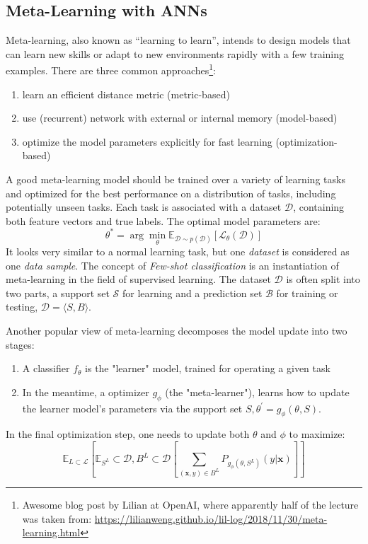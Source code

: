 \documentclass[main]{subfiles}
\begin{document}
\subsection{Meta-Learning with ANNs}
Meta-learning, also known as “learning to learn”, intends to design models that can learn new skills or adapt to new environments rapidly with a few training examples. There are three common approaches\footnote{Awesome blog post by Lilian at OpenAI, where apparently half of the lecture was taken from: \url{https://lilianweng.github.io/lil-log/2018/11/30/meta-learning.html}}: 
\begin{enumerate}
    \item learn an efficient distance metric (metric-based)
    \item use (recurrent) network with external or internal memory (model-based)
    \item optimize the model parameters explicitly for fast learning (optimization-based)
\end{enumerate}

A good meta-learning model should be trained over a variety of learning tasks and optimized for the best performance on a distribution of tasks, including potentially unseen tasks. Each task is associated with a dataset $\mathcal{D}$, containing both feature vectors and true labels. The optimal model parameters are:
%
\begin{equation}
\theta^{*}=\arg \min _{\theta} \mathbb{E}_{\mathcal{D} \sim p(\mathcal{D})}\left[\mathcal{L}_{\theta}(\mathcal{D})\right]
\end{equation}
%
It looks very similar to a normal learning task, but one \textit{dataset} is considered as one \textit{data sample}. The concept of \textit{Few-shot classification} is an instantiation of meta-learning in the field of supervised learning. The dataset $\mathcal{D}$ is often split into two parts, a support set $\mathcal{S}$ for learning and a prediction set $\mathcal{B}$ for training or testing,  $\mathcal{D}=\langle S, B\rangle$. 

Another popular view of meta-learning decomposes the model update into two stages:
\begin{enumerate}
    \item A classifier $f_{\theta}$ is the "learner" model, trained for operating a given task
    \item In the meantime, a optimizer $g_{\phi}$ (the "meta-learner"), learns how to update the learner model's parameters via the support set $S, \theta^{'} = g_{\phi}(\theta, S).$
\end{enumerate}
In the final optimization step, one needs to update both $\theta$ and $\phi$ to maximize:
\begin{equation}
\mathbb{E}_{L \subset \mathcal{L}}\left[\mathbb{E}_{S^{L}} \subset \mathcal{D}, B^{L} \subset \mathcal{D}\left[\sum_{(\mathbf{x}, y) \in B^{L}} P_{g_{\phi}\left(\theta, S^{L}\right)}(y | \mathbf{x})\right]\right]
\end{equation}
\end{document}
